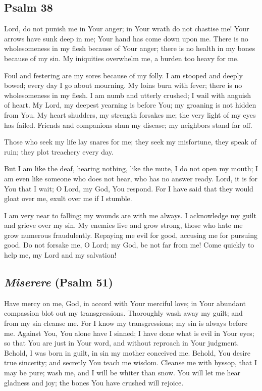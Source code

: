 \documentclass[12pt]{article}
\newcommand{\prayertitle}[1]{\subsection{#1}}
\newcommand{\indulgencedprayertitle}[1]{\prayertitle{#1 \protect\kreuz}}
\newcommand{\foreign}[1]{\textsl{#1}}
\begin{document}
\indulgencedprayertitle{Psalm 38}
Lord, do not punish me in Your anger;
in Your wrath do not chastise me!
Your arrows have sunk deep in me;
Your hand has come down upon me.
There is no wholesomeness in my flesh because of Your anger;
there is no health in my bones because of my sin.
My iniquities overwhelm me, a burden too heavy for me.

Foul and festering are my sores because of my folly.
I am stooped and deeply bowed;
every day I go about mourning.
My loins burn with fever;
there is no wholesomeness in my flesh.
I am numb and utterly crushed;
I wail with anguish of heart.
My Lord, my deepest yearning is before You;
my groaning is not hidden from You.
My heart shudders, my strength forsakes me;
the very light of my eyes has failed.
Friends and companions shun my disease;
my neighbors stand far off.

Those who seek my life lay snares for me;
they seek my misfortune, they speak of ruin;
they plot treachery every day.

But I am like the deaf, hearing nothing, like the mute, I do not open my mouth;
I am even like someone who does not hear, who has no answer ready.
Lord, it is for You that I wait;
O Lord, my God, You respond.
For I have said that they would gloat over me, exult over me if I stumble.

I am very near to falling;
my wounds are with me always.
I acknowledge my guilt
and grieve over my sin.
My enemies live and grow strong, those who hate me grow numerous fraudulently.
Repaying me evil for good,
accusing me for pursuing good.
Do not forsake me, O Lord;
my God, be not far from me!
Come quickly to help me, my Lord and my salvation!

\indulgencedprayertitle{\foreign{Miserere} (Psalm 51)}
Have mercy on me, God, in accord with Your merciful love;
in Your abundant compassion blot out my transgressions.
Thoroughly wash away my guilt;
and from my sin cleanse me.
For I know my transgressions;
my sin is always before me.
Against You, You alone have I sinned;
I have done what is evil in Your eyes;
so that You are just in Your word, and without reproach in Your judgment.
Behold, I was born in guilt, in sin my mother conceived me.
Behold, You desire true sincerity;
and secretly You teach me wisdom.
Cleanse me with hyssop, that I may be pure;
wash me, and I will be whiter than snow.
You will let me hear gladness and joy;
the bones You have crushed will rejoice.
\end{document}
